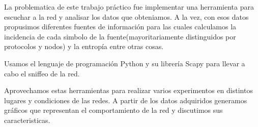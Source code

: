 La problematica de este trabajo práctico fue implementar una herramienta para escuchar a la red y analisar los datos que obteniamos. A la vez, con esos datos propusimos diferentes
fuentes de información para las cuales calculamos la incidencia de cada simbolo de la fuente(mayoritariamente distinguidos por protocolos y nodos) y la entropía entre otras 
cosas. 

Usamos el lenguaje de programación Python y su librería Scapy para llevar a cabo el sniffeo de la red. 

Aprovechamos estas herramientas para realizar varios experimentos en distintos lugares y condiciones de las redes. A partir de los datos adquiridos generamos gráficos que representan
el comportamiento de la red y discutimos sus caracteristicas.